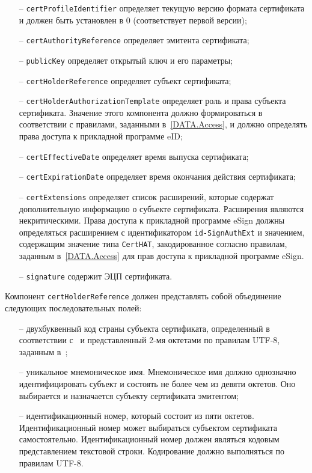 \begin{itemize}
\item[--]
\verb|certProfileIdentifier| 
определяет текущую версию формата сертификата и 
должен быть установлен в 0 (соответствует первой версии); 

\item[--] 
\verb|certAuthorityReference| определяет эмитента сертификата;

\item[--]
\verb|publicKey| определяет открытый ключ и его параметры;

\item[--]
\verb|certHolderReference| определяет субъект сертификата;

\item[--]
\verb|certHolderAuthorizationTemplate| определяет роль и права субъекта 
сертификата. 
Значение этого компонента должно формироваться в 
соответствии с правилами, заданными в~\ref{DATA.Access}, 
и должно определять права доступа к прикладной программе eID;

\item[--]
\verb|certEffectiveDate| определяет время выпуска сертификата;

\item[--]
\verb|certExpirationDate| определяет время окончания действия сертификата;

\item[--]
\verb|certExtensions| определяет список расширений, которые содержат 
дополнительную информацию о субъекте сертификата. 
Расширения являются некритическими.
Права доступа к прикладной программе 
eSign должны определяться расширением с идентификатором
\verb|id-SignAuthExt| и значением, содержащим 
значение типа \verb|CertHAT|, закодированное 
согласно правилам, заданным в~\ref{DATA.Access}
для прав доступа к прикладной программе eSign.  

\item[--]
\verb|signature| содержит ЭЦП сертификата.
\end{itemize}

Компонент \verb|certHolderReference| должен представлять собой объединение 
следующих последовательных полей: 

\begin{itemize}
\item[--]
двухбуквенный код страны субъекта сертификата, определенный в 
соответствии с~\cite{CountryCodes} и представленный 2-мя октетами 
по правилам UTF-8, заданным в~\cite{UTF8}; 

\item[--]
уникальное мнемоническое имя. Мнемоническое имя должно однозначно 
идентифицировать субъект и состоять не более чем из девяти октетов. Оно 
выбирается и назначается субъекту сертификата эмитентом; 

\item[--]
идентификационный номер, который состоит из пяти октетов. 
Идентификационный номер может выбираться субъектом сертификата 
самостоятельно. Идентификационный номер должен являться кодовым 
представлением текстовой строки. Кодирование должно выполняться по 
правилам UTF-8. 
\end{itemize}

